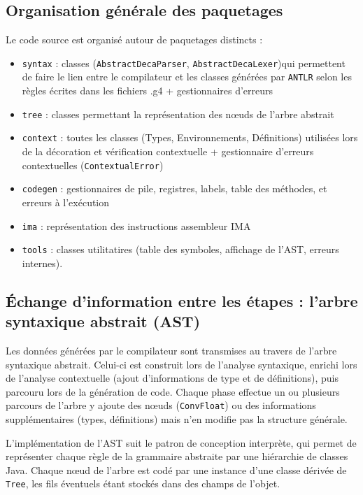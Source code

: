 \subsection{Organisation générale des paquetages}
\noindent
Le code source est organisé autour de paquetages distincts : 
\begin{itemize}[label=$\circ$]
    \item \texttt{syntax} : classes (\texttt{AbstractDecaParser}, \texttt{AbstractDecaLexer})qui permettent de faire le lien entre le compilateur et les classes générées par \texttt{ANTLR} selon les règles écrites dans les fichiers .g4 + gestionnaires d'erreurs
    \item \texttt{tree} : classes permettant la représentation des nœuds de l'arbre abstrait
    \item \texttt{context} : toutes les classes (Types, Environnements, Définitions) utilisées lors de la décoration et vérification contextuelle + gestionnaire d'erreurs contextuelles (\texttt{ContextualError})
    \item \texttt{codegen} : gestionnaires de pile, registres, labels, table des méthodes, et erreurs à l'exécution
    \item \texttt{ima} : représentation des instructions assembleur IMA
    \item \texttt{tools} : classes utilitatires (table des symboles, affichage de l'AST, erreurs internes).
\end{itemize}


\subsection{Échange d'information entre les étapes : l'arbre syntaxique abstrait (AST)}
\label{subsec:ast-architecture}

\noindent
Les données générées par le compilateur sont transmises au travers de l'arbre syntaxique abstrait. Celui-ci est construit lors de l'analyse syntaxique, enrichi lors de l'analyse contextuelle (ajout d'informations de type et de définitions), puis parcouru lors de la génération de code. Chaque phase effectue un ou plusieurs parcours de l'arbre y ajoute des nœuds (\texttt{ConvFloat}) ou des informations supplémentaires (types, définitions) mais n'en modifie pas la structure générale.

\noindent
L'implémentation de l'AST suit le patron de conception interprète, qui permet de représenter chaque règle de la grammaire abstraite par une hiérarchie de classes Java.  
Chaque nœud de l'arbre est codé par une instance d'une classe dérivée de \texttt{Tree}, les fils éventuels étant stockés dans des champs de l'objet.  

